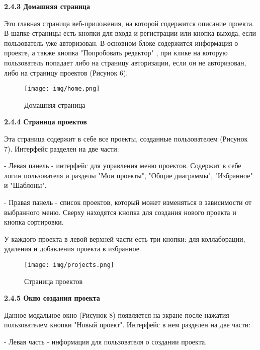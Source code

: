 \textbf{2.4.3 Домашняя страница}

Это главная страница веб-приложения, на которой содержится описание проекта.
В шапке страницы есть кнопки для входа и регистрации или кнопка выхода, если пользователь уже авторизован. В основном блоке содержится информация о проекте, а также кнопка "Попробовать редактор" , при клике на которую пользователь попадает либо на страницу авторизации, если он не авторизован, либо на страницу проектов (Рисунок 6).

\renewcommand{\figurename}{Рисунок}
\begin{figure}[htbp]
    \centering %
    \texttt{[image: img/home.png]}
    \caption{Домашняя страница}
    \label{fig:analyze} %
\end{figure}

\textbf{2.4.4 Страница проектов}

Эта страница содержит в себе все проекты, созданные пользователем (Рисунок 7). Интерфейс разделен на две части:

    - Левая панель - интерфейс для управления меню проектов. Содержит в себе логин пользователя и разделы "Мои проекты", "Общие диаграммы", "Избранное" и "Шаблоны".
    
    - Правая панель - список проектов, который может изменяться в зависимости от выбранного меню. Сверху находятся кнопка для создания нового проекта и кнопка сортировки.

У каждого проекта в левой верхней части есть три кнопки: для коллаборации, удаления и добавления проекта в избранное.

\renewcommand{\figurename}{Рисунок}
\begin{figure}[htbp]
    \centering %
    \texttt{[image: img/projects.png]}
    \caption{Страница проектов}
    \label{fig:analyze} %
\end{figure}

\newpage

\textbf{2.4.5 Окно создания проекта}

Данное модальное окно (Рисунок 8) появляется на экране после нажатия пользователем кнопки "Новый проект". Интерфейс в нем разделен на две части:

    - Левая часть - информация для пользователя о создании проекта.
    
